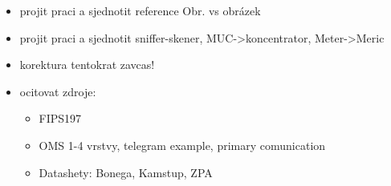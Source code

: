 \begin{itemize}
	\item projit praci a sjednotit reference Obr. vs obrázek
	\item projit praci a sjednotit sniffer-skener, MUC->koncentrator, Meter->Meric
	\item korektura tentokrat zavcas!
	\item ocitovat zdroje:
		\begin{itemize}
			\item FIPS197
			\item OMS 1-4 vrstvy, telegram example, primary comunication
			\item Datashety: Bonega, Kamstup, ZPA
		\end{itemize}
\end{itemize}
